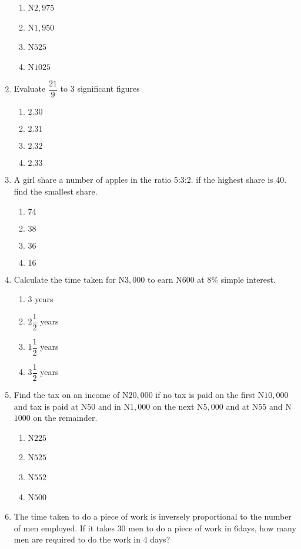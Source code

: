 \begin{multicols}{2}
\begin{enumerate}[label={\arabic*.}]
    \begin{enumerate}[label={\Alph*.}]
    \item N\(2,975\)
    \item N\(1,950\)
    \item N\(525\)
    \item N\(1025\)
    \end{enumerate}
\item Evaluate \(\dfrac{21}{9}\) to 3 significant figures
    \begin{enumerate}[label={\Alph*.}]
    \item \(2.30\)
    \item \(2.31\)
    \item \(2.32\)
    \item \(2.33\)
    \end{enumerate}
\item A girl share a number of apples in the ratio 5:3:2. if the highest share is 40. find the smallest share.
    \begin{enumerate}[label={\Alph*.}]
    \item \(74\)
    \item \(38\)
    \item \(36\)
    \item \(16\)
    \end{enumerate}
\item Calculate the time taken for N\(3,000\) to earn N600 at 8\% simple interest.
    \begin{enumerate}[label={\Alph*.}]
    \item \(3\) years
    \item \(2\dfrac{1}{2}\) years
    \item \(1\dfrac{1}{2}\) years
    \item \(3\dfrac{1}{2}\) years
    \end{enumerate}
\item Find the tax on an income of N\(20,000\) if no tax is paid on the first N\(10,000\) and tax is paid at N50 and in N\(1,000\)
on the next N\(5,000\) and at N\(55\) and N\(1000\) on the remainder. 
    \begin{enumerate}[label={\Alph*.}]
    \item N\(225\)
    \item N\(525\)
    \item N\(552\)
    \item N\(500\)
    \end{enumerate}
\item The time taken to do a piece of work is inversely proportional to the number of men employed. If it takes \(30\) men to do a piece of work in \(6\)days, how many men are required to do the work in 4 days?

\end{enumerate}
\end{multicols}
